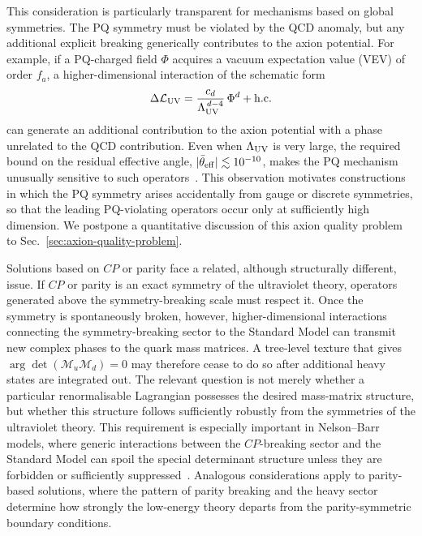 \documentclass[review]{elsarticle}
\numberwithin{equation}{section}
\numberwithin{table}{section}
\numberwithin{figure}{section}
\def\L{\mathcal{L}}
\def\M{\mathcal{M}}
\def\hc{{\rm h.c.}}
\begin{document}
This consideration is particularly transparent for mechanisms based on global symmetries. The PQ symmetry must be violated by the QCD anomaly, but any additional explicit breaking generically contributes to the axion potential. For example, if a PQ-charged field $\Phi$ acquires a vacuum expectation value (VEV) of order $f_a$, a higher-dimensional interaction of the schematic form
\begin{align}
    \Delta\L_{\rm UV} = \frac{c_d}{\Lambda_{\rm UV}^{\,d-4}}\, \Phi^d+\hc
    \label{eq:PQ-breaking-UV-operator}
\end{align}
can generate an additional contribution to the axion potential with a phase unrelated to the QCD contribution. Even when $\Lambda_{\rm UV}$ is very large, the required bound on the residual effective angle, $|\bar\theta_{\rm eff}|\lesssim10^{-10}$, makes the PQ mechanism unusually sensitive to such operators~\cite{Barr:1992qq,Holman:1992us}. This observation motivates constructions in which the PQ symmetry arises accidentally from gauge or discrete symmetries, so that the leading PQ-violating operators occur only at sufficiently high dimension. We postpone a quantitative discussion of this axion quality problem to Sec.~\ref{sec:axion-quality-problem}.

Solutions based on $CP$ or parity face a related, although structurally different, issue. If $CP$ or parity is an exact symmetry of the ultraviolet theory, operators generated above the symmetry-breaking scale must respect it. Once the symmetry is spontaneously broken, however, higher-dimensional interactions connecting the symmetry-breaking sector to the Standard Model can transmit new complex phases to the quark mass matrices. A tree-level texture that gives $\arg\det(\M_u\M_d)=0$ may therefore cease to do so after additional heavy states are integrated out. The relevant question is not merely whether a particular renormalisable Lagrangian possesses the desired mass-matrix structure, but whether this structure follows sufficiently robustly from the symmetries of the ultraviolet theory. This requirement is especially important in Nelson--Barr models, where generic interactions between the $CP$-breaking sector and the Standard Model can spoil the special determinant structure unless they are forbidden or sufficiently suppressed~\cite{Dine:2015jga}. Analogous considerations apply to parity-based solutions, where the pattern of parity breaking and the heavy sector determine how strongly the low-energy theory departs from the parity-symmetric boundary conditions.
\end{document}
